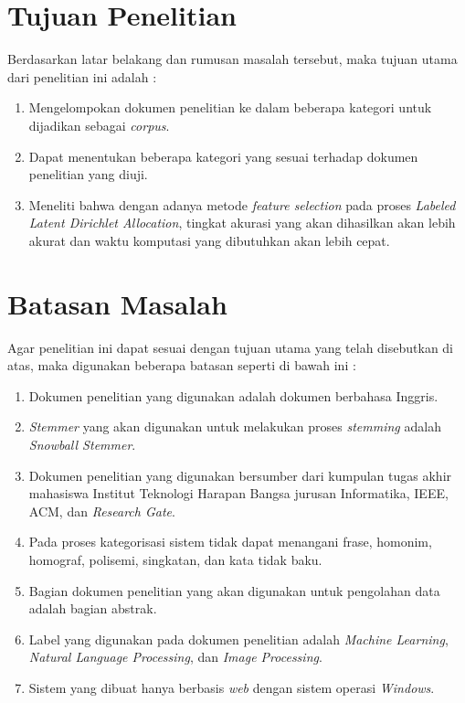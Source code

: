 \section{Tujuan Penelitian}
\indent 
Berdasarkan latar belakang dan rumusan masalah tersebut, maka tujuan utama dari penelitian ini adalah :

\begin{enumerate}[nolistsep,leftmargin=0.5cm]
\item 
Mengelompokan dokumen penelitian ke dalam beberapa kategori untuk dijadikan sebagai {\itshape corpus}.
\item 
Dapat menentukan beberapa kategori yang sesuai terhadap dokumen penelitian yang diuji.
\item 
Meneliti bahwa dengan adanya metode {\itshape feature selection} pada proses {\itshape Labeled Latent Dirichlet Allocation}, tingkat akurasi yang akan dihasilkan akan lebih akurat dan waktu komputasi yang dibutuhkan akan lebih cepat.
\end{enumerate}

\section{Batasan Masalah}
\indent 
Agar penelitian ini dapat sesuai dengan tujuan utama yang telah disebutkan di atas, maka digunakan beberapa batasan seperti di bawah ini :

\begin{enumerate}[nolistsep,leftmargin=0.5cm]
\item 
Dokumen penelitian yang digunakan adalah dokumen berbahasa Inggris.
\item 
{\itshape Stemmer} yang akan digunakan untuk melakukan proses {\itshape stemming} adalah {\itshape Snowball Stemmer}.
\item 
Dokumen penelitian yang digunakan bersumber dari kumpulan tugas akhir mahasiswa Institut Teknologi Harapan Bangsa jurusan Informatika, IEEE, ACM, dan {\itshape Research Gate}.
\item 
Pada proses kategorisasi sistem tidak dapat menangani frase, homonim, homograf, polisemi, singkatan, dan kata tidak baku.
\item 
Bagian dokumen penelitian yang akan digunakan untuk pengolahan data adalah bagian abstrak.
\item
Label yang digunakan pada dokumen penelitian adalah {\itshape Machine Learning}, {\itshape Natural Language Processing}, dan {\itshape Image Processing}.
\item
Sistem yang dibuat hanya berbasis {\itshape web} dengan sistem operasi {\itshape Windows}.
\end{enumerate}

